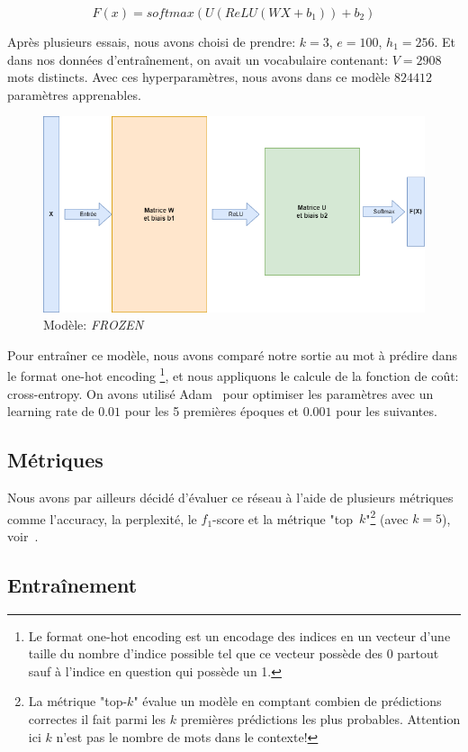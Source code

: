 \documentclass[a4paper]{article}
\begin{document}
\begin{equation}
  F(x)=softmax(U(ReLU(WX+b_1))+b_2)
  \label{eq:model1}
\end{equation}

Après plusieurs essais, nous avons choisi de prendre: $k=3$, $e=100$, $h_1=256$. Et dans nos données d'entraînement, on avait un 
vocabulaire contenant: $V=2908$ mots distincts. Avec ces hyperparamètres, nous avons dans ce modèle $824412$ paramètres apprenables.


\begin{figure}[ht]
    \centering
    \includegraphics[width=0.60\linewidth]{model1.png}
    \caption{Modèle: \textit{FROZEN}}
    \label{fig:model1}
\end{figure}

Pour entraîner ce modèle, nous avons comparé notre sortie au mot à prédire dans le format one-hot encoding
\footnote{Le format one-hot encoding est un encodage des indices en un vecteur d'une taille du nombre d'indice possible tel que 
ce vecteur possède des 0 partout sauf à l'indice en question qui possède un 1.}, et nous appliquons le calcule de la fonction de 
coût: cross-entropy. 
On avons utilisé Adam~\cite{kingma2014adam} pour optimiser les paramètres avec un learning rate de $0.01$ pour les 5 premières 
époques et $0.001$ pour les suivantes.

\subsection{Métriques}
Nous avons par ailleurs décidé d'évaluer ce réseau à l'aide de plusieurs métriques comme l'accuracy, la perplexité, le $f_1$-score 
et la métrique "top~$k$"\footnote{La métrique "top-$k$" évalue un modèle en comptant combien de prédictions correctes il fait parmi 
les $k$ premières prédictions les plus probables. Attention ici $k$ n'est pas le nombre de mots dans le contexte!} (avec $k=5$), 
voir~\cite{DBLP:journals/corr/LiuDLZ15}.

\subsection{Entraînement}
\end{document}
